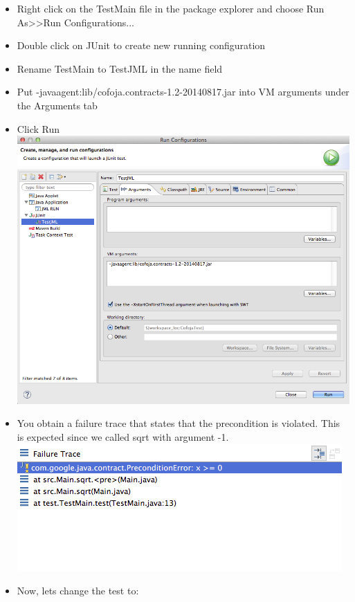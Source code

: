 \documentclass{article}
\begin{document}
\begin{itemize}
\begin{lstlisting}
\end{lstlisting}
\item Right click on the TestMain file in the package explorer and
  choose Run As>>Run Configurations...
\item Double click on JUnit to create new running configuration
\item Rename TestMain to TestJML in the name field
\item Put -javaagent:lib/cofoja.contracts-1.2-20140817.jar into VM
  arguments under the Arguments tab
\item Click Run\\
\includegraphics[scale=0.4]{Photos/11.png}\\
\item You obtain a failure trace that states that the precondition is
  violated. This is expected since we called sqrt with argument -1.\\
\includegraphics[scale=0.7]{Photos/9.png}\\
\item Now, lets change the test to:
\begin{lstlisting}

\end{lstlisting}
\end{itemize}
\end{document}
